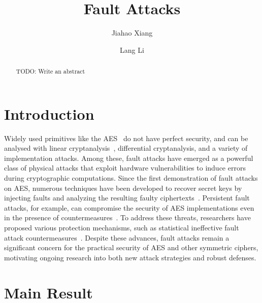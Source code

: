 \documentclass[journal=tches,final]{iacrtrans}
\author{Jiahao Xiang\inst{1} \and Lang Li\inst{1}}
\institute{
  Hengyang Normal University, College of Computer Science and Technology, Hengyang, China
}
\title{Fault Attacks}
\begin{document}
\maketitle




\begin{abstract}
 TODO: Write an abstract
\end{abstract}


\section{Introduction}

Widely used primitives like the AES~\cite{AES} do not have perfect
security, and can be analysed with linear
cryptanalysis~\cite{AC:DLNS20}, differential cryptanalysis, and a variety of implementation attacks. 
Among these, fault attacks have emerged as a powerful class of physical attacks that exploit hardware vulnerabilities to induce errors during cryptographic computations. 
Since the first demonstration of fault attacks on AES, numerous techniques have been developed to recover secret keys by injecting faults and analyzing the resulting faulty ciphertexts~\cite{TCHES:ZZJZBZ20,EC:SBRPM20}. 
Persistent fault attacks, for example, can compromise the security of AES implementations even in the presence of countermeasures~\cite{TCHES:ZZJZBZ20}. 
To address these threats, researchers have proposed various protection mechanisms, such as statistical ineffective fault attack countermeasures~\cite{TCHES:DDEGMP20}. 
Despite these advances, fault attacks remain a significant concern for the practical security of AES and other symmetric ciphers, motivating ongoing research into both new attack strategies and robust defenses. 

\section{Main Result}
\label{sec:main}




\end{document}
